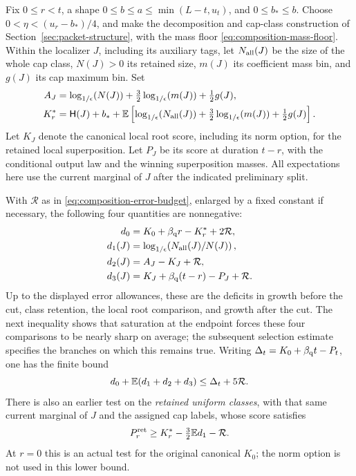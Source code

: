 \begin{proposition}
\label{prop:finite-packet-composition}
Fix $0\le r<t$, a shape $0\le b\le a\le\min(L-t,u_t)$,
and $0\le b_*\le b$.  Choose
$0<\eta<(u_r-b_*)/4$, and make the decomposition and cap-class
construction of Section~\ref{sec:packet-structure}, with the mass floor
\eqref{eq:composition-mass-floor}.  Within the localizer $J$, including
its auxiliary tags, let $N_{\rm all}(J)$ be the size of the whole cap
class, $N(J)>0$ its retained size, $m(J)$ its coefficient mass bin, and
$g(J)$ its cap maximum bin.  Set
\begin{align}
 A_J&=\log_{1/\epsilon}\!\left(N(J)\right)+\tfrac32\log_{1/\epsilon}\!\left(m(J)\right)+\tfrac12g(J),
       \label{eq:composition-A}\\
 K_r^*&=\mathsf H(J)+b_*+
       \mathbb E\left[\log_{1/\epsilon}\!\left(N_{\rm all}(J)\right)
                    +\tfrac32\log_{1/\epsilon}\!\left(m(J)\right)+\tfrac12g(J)\right].
       \label{eq:composition-Kstar}
\end{align}
Let $K_J$ denote the canonical local root score, including its norm
option, for the retained local superposition.  Let $P_J$ be its score
at duration $t-r$, with the conditional output law and the winning
superposition masses.  All expectations here use the current marginal
of $J$ after the indicated preliminary split.

With $\mathcal R$ as in \eqref{eq:composition-error-budget}, enlarged
by a fixed constant if necessary, the following four quantities are
nonnegative:
\begin{align}
 d_0&=K_0+\beta_{\mathrm q} r-K_r^*+2\mathcal R,\nonumber\\
 d_1(J)&=\log_{1/\epsilon}\!\left(N_{\rm all}(J)/N(J)\right),\nonumber\\
 d_2(J)&=A_J-K_J+\mathcal R,\nonumber\\
 d_3(J)&=K_J+\beta_{\mathrm q}(t-r)-P_J+\mathcal R.
       \label{eq:four-packet-deficits}
\end{align}
Up to the displayed error allowances, these are the deficits in
growth before the cut, class retention, the local root comparison,
and growth after the cut. The next inequality shows that saturation
at the endpoint forces these four comparisons to be nearly sharp
on average; the subsequent selection estimate specifies the
branches on which this remains true.
Writing $\Delta_t=K_0+\beta_{\mathrm q} t-P_t$, one has the finite bound
\begin{equation}\label{eq:finite-packet-deficits}
 d_0+\mathbb E(d_1+d_2+d_3)\le\Delta_t+5\mathcal R.
\end{equation}
There is also an earlier test on the \emph{retained uniform classes},
with that same current marginal of $J$ and the assigned cap labels, whose
score satisfies
\begin{equation}\label{eq:retained-back-score}
 P_r^{\rm ret}\ge K_r^*
              -\tfrac32\mathbb E d_1-\mathcal R.
\end{equation}
At $r=0$ this is an actual test for the original canonical $K_0$;
the norm option is not used in this lower bound.


\end{proposition}
